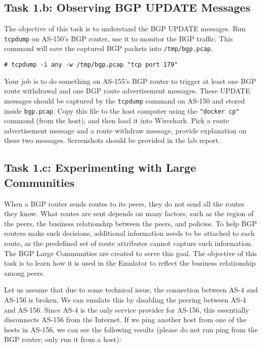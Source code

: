 \subsection{Task 1.b: Observing BGP UPDATE Messages} 

The objective of this task is to understand the BGP UPDATE messages. 
Run \texttt{tcpdump} on AS-150's BGP router,
use it to monitor the BGP traffic. This command will save the 
captured BGP packets into \texttt{/tmp/bgp.pcap}.  

\begin{lstlisting}
# tcpdump -i any -w /tmp/bgp.pcap "tcp port 179"
\end{lstlisting}

Your job is to do something on AS-155's BGP router to trigger
at least one BGP route withdrawal and one BGP route advertisement
messages. These UPDATE messages should be captured by
the \texttt{tcpdump} command on AS-150 and stored inside \texttt{bgp.pcap}.
Copy this file to the host computer using the \texttt{"docker cp"} command (from the host),
and then load it into Wireshark. 
Pick a route advertisement message and a route withdraw message, provide
explanation on these two messages. Screenshots should be provided in the 
lab report.



\subsection{Task 1.c: Experimenting with Large Communities} 

When a BGP router sends routes to its peers, they do not send all the routes they
know. What routes are sent depends on many factors, such as the
region of the peers, the business relationship between the peers,
and policies. To help BGP routers make such decisions, additional
information needs to be attached to each route, as the predefined
set of route attributes cannot capture such information.
The BGP Large Communities are created to serve this goal.
The objective of this task is to learn how it is used 
in the Emulator to reflect the business relationship
among peers. 

Let us assume that due to some technical issue, 
the connection between AS-4 and AS-156 is broken.  We can
emulate this by disabling the peering between AS-4 and AS-156.
Since AS-4 is the only service provider for AS-156, this essentially
disconnects AS-156 from the Internet. If we ping another host from
one of the hosts in AS-156, we can see the following results (please 
do not run ping from the BGP router; only run it from a host):

